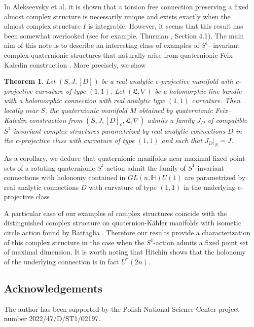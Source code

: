 \documentclass{amsart}
\newtheorem*{thx}{Theorem}
\begin{document}
In Alekseevsky et al. \cite{AMP} it is shown that  a torsion free connection preserving a fixed almost complex structure is necessarily unique and exists exactly when the almost complex structure $I$ is integrable. However, it seems that this result has been somewhat overlooked (see for example, Thurman \cite{T}, Section 4.1).  The main aim of this note is to describe an interesting class of examples of $S^1$- invariant complex quaternionic structures that naturally arise from quaternionic Feix--Kaledin construction \cite{BC}. More precisely, we show
\begin{thx}
    Let $(S,J,[D])$ be a real analytic c-projective manifold with c-projective curvature of type $(1,1)$. Let $(\mathfrak{L},\nabla)$ be a holomorphic line bundle with a holomorphic connection with real analytic type $(1,1)$ curvature. Then locally near $S$, the quaternionic manifold $M$ obtained by quaternionic Feix--Kaledin construction from $(S,J,[D]_c,\mathfrak{L},\nabla) $  admits a family $J_D$ of compatible $S^1$-invariant complex structures parametrized by real analytic connections $D$ in the c-projective class with curvature of type $(1,1)$ and such that $J_D|_S=J$. 
\end{thx}


As a corollary, we deduce that quaternionic manifolds near maximal fixed point sets of a rotating quaternionic $S^1$-action admit the family of $S^1$-invariant connections with holonomy contained in $GL(n,\mathbb{H})U(1)$ are parametrized by real analytic connections $D$ with curvature of type $(1,1)$ in the underlying c-projective class .


A particular case of our examples of complex structures coincide with the distinguished complex structure on quaternion-K\"ahler manifolds with isometic circle action found by Battaglia \cite{Bat}. Therefore our results provide a characterization of this complex structure in the case when the $S^1$-action admits a fixed point set of maximal dimension.
It is worth noting that Hitchin \cite{Hit3} shows that the holonomy of the underlying connection is in fact  $U^*(2n)$. 
\subsection*{Acknowledgements}
The author has been supported by the Polish National Science Center project number 2022/47/D/ST1/02197. 
\end{document}
